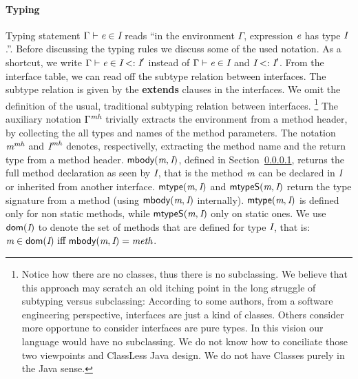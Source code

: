 \paragraph{Typing} 
Typing statement $\Gamma \vdash \textit{e}\in\textit{I}$ reads ``in the environment
$\Gamma$, expression $\textit{e}$ has type $\textit{I}$.''. 
Before discussing the typing rules we discuss some of the used notation.
As a shortcut, we write
$\Gamma \vdash \textit{e}\in\textit{I}<:\textit{I}'$ instead of $\Gamma \vdash \textit{e}\in\textit{I}$ and
$\textit{I}<:\textit{I}'$.  From the interface table, we can read off the subtype
relation between interfaces. The subtype relation is given by the
\textbf{extends} clauses in the interfaces. We omit the definition of
the usual, traditional subtyping relation between interfaces.%
\footnote{ Notice how there are no classes, thus there is no
  subclassing.  We believe that this approach may scratch an old
  itching point in the long struggle of subtyping versus subclassing:
  According to some authors, from a software engineering perspective,
  interfaces are just a kind of classes. Others consider more
  opportune to consider interfaces are pure types. In this vision our
  language would have no subclassing. We do not know how to conciliate
  those two viewpoints and ClassLess Java design. We do not have
  Classes purely in the Java sense.}
The auxiliary notation $\Gamma^\textit{mh}$ trivially
extracts the environment from a method header, by collecting the all types
and names of the method parameters.  The
notation $\textit{m}^\textit{mh}$ and $\textit{I}^\textit{mh}$ denotes, respectivelly, extracting the
method name and the return type from a method header. $\textsf{mbody}(\textit{m},\textit{I})$,
defined in Section~\ref{},
returns the full method declaration as seen by $\textit{I}$, that is the
method $\textit{m}$ can be declared in $\textit{I}$ or inherited from another
interface. 
$\textsf{mtype}(\textit{m},\textit{I})$ and $\textsf{mtypeS}(\textit{m},\textit{I})$ return the type
signature from a method (using $\textsf{mbody}(\textit{m},\textit{I})$ internally).
$\textsf{mtype}(\textit{m},\textit{I})$ is defined only for non static methods, while
$\textsf{mtypeS}(\textit{m},\textit{I})$ only on static ones. We use $\textsf{dom}(\textit{I})$ to
denote the set of methods that are defined for type $\textit{I}$, that is:
$\m\in\dom(\C)\ \miff \ \mBody(\m,\C)=\method$.

